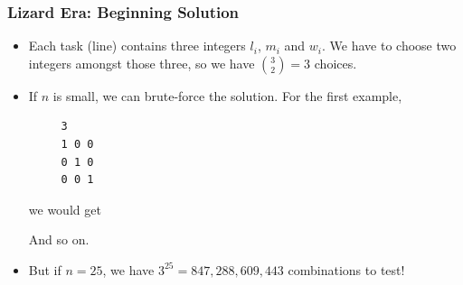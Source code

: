 \documentclass{beamer}
\begin{document}
\begin{frame}[fragile]
\frametitle{Lizard Era: Beginning Solution}


\footnotesize

\begin{itemize}

\item Each task (line) contains three integers $l_i$, $m_i$ and $w_i$. We have to choose two integers amongst those three, so we have ${{3}\choose{2}} = 3$ choices.

\item<2-> If $n$ is small, we can brute-force the solution. For the first example,
\begin{verbatim}
     3
     1 0 0
     0 1 0
     0 0 1
\end{verbatim}
we would get
\vspace{-0.2cm}
And so on.

\item<13-> But if $n = 25$, we have $3^{25} = 847,288,609,443$ combinations to test!

\end{itemize}

\end{frame}
\end{document}
